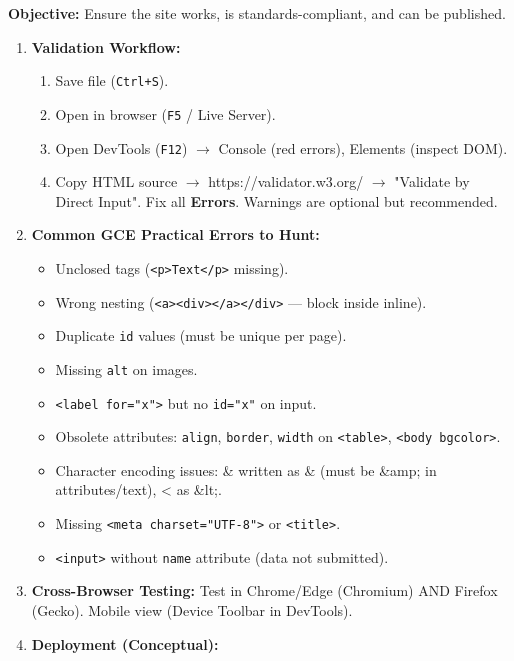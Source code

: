\documentclass[11pt]{article}
\begin{document}
\begin{methode}
\textbf{Objective:} Ensure the site works, is standards-compliant, and can be published.
\begin{enumerate}
    \item \textbf{Validation Workflow:}
        \begin{enumerate}
            \item Save file (\texttt{Ctrl+S}).
            \item Open in browser (\texttt{F5} / Live Server).
            \item Open DevTools (\texttt{F12}) $\to$ Console (red errors), Elements (inspect DOM).
            \item Copy HTML source $\to$ https://validator.w3.org/ $\to$ "Validate by Direct Input". Fix all \textbf{Errors}. Warnings are optional but recommended.
        \end{enumerate}
    \item \textbf{Common GCE Practical Errors to Hunt:}
        \begin{itemize}
            \item Unclosed tags (\texttt{<p>Text</p>} missing).
            \item Wrong nesting (\texttt{<a><div></a></div>} — block inside inline).
            \item Duplicate \texttt{id} values (must be unique per page).
            \item Missing \texttt{alt} on images.
            \item \texttt{<label for="x">} but no \texttt{id="x"} on input.
            \item Obsolete attributes: \texttt{align}, \texttt{border}, \texttt{width} on \texttt{<table>}, \texttt{<body bgcolor>}.
            \item Character encoding issues: \& written as \& (must be \&amp; in attributes/text), < as \&lt;.
            \item Missing \texttt{<meta charset="UTF-8">} or \texttt{<title>}.
            \item \texttt{<input>} without \texttt{name} attribute (data not submitted).
        \end{itemize}
    \item \textbf{Cross-Browser Testing:} Test in Chrome/Edge (Chromium) AND Firefox (Gecko). Mobile view (Device Toolbar in DevTools).
    \item \textbf{Deployment (Conceptual):}
        \begin{itemize}

\end{itemize}
\end{enumerate}
\end{methode}
\end{document}
